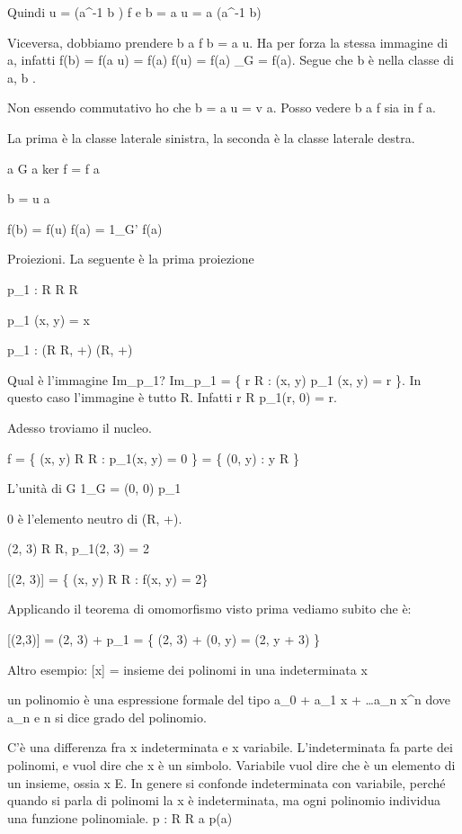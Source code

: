 Quindi u = (a^{-1} \cdot b ) \in \ker f e b = a \cdot u = a \cdot (a^{-1} \cdot b)

Viceversa, dobbiamo prendere b \in a \cdot \ker f \Rightarrow b = a \cdot u. Ha per forza la stessa immagine di a, infatti f(b) = f(a \cdot u) = f(a) \cdot f(u) = f(a) _G = f(a). Segue che b \`e nella classe di a, b \in [a].

Non essendo commutativo ho che b = a \cdot u = v \cdot a. Posso vedere b \in a \cdot \ker f sia in \ker f \cdot a.

La prima \`e la classe laterale sinistra, la seconda \`e la classe laterale destra.

\forall a \in G a \cdot ker f = \ker f \cdot a

b = u \cdot a

f(b) = f(u) \cdot f(a) = 1_{G'} \cdot f(a)

Proiezioni. La seguente \`e la prima proiezione

p_1 : R \times R \to R

p_1 (x, y) = x

p_1 : (R \times R, +) \to (R, +)

Qual \`e l'immagine Im_{p_1}? Im_{p_1} = \{ r \in R : \exists (x, y) p_1 (x, y) = r \}. In questo caso l'immagine \`e tutto R. Infatti \forall r \in R p_1(r, 0) = r.

Adesso troviamo il nucleo.

\ker f = \{ (x, y) \in R \times R : p_1(x, y) = 0 \} = \{ (0, y) : y \in R \}

L'unit\`a di G 1_G = (0, 0) \in \ker p_1

0 \`e l'elemento neutro di (R, +).

(2, 3) \in R \times R, p_1(2, 3) = 2

[(2, 3)] = \{ (x, y) \in R \times R : f(x, y) = 2\}

Applicando il teorema di omomorfismo visto prima vediamo subito che \`e:

[(2,3)] = (2, 3) + \ker p_1 = \{ (2, 3) + (0, y) = (2, y + 3) \}

Altro esempio:
[x] = insieme dei polinomi in una indeterminata x

un polinomio \`e una espressione formale del tipo a_0 + a_1 x + \dots a_n x^n dove a_n  e n si dice grado del polinomio.

C'\`e una differenza fra x \to indeterminata e x \to variabile. L'indeterminata fa parte dei polinomi, e vuol dire che x \`e un simbolo. Variabile vuol dire che \`e un elemento di un insieme, ossia x \in E. In genere si confonde indeterminata con variabile, perch\'e quando si parla di polinomi la x \`e indeterminata, ma ogni polinomio individua una funzione polinomiale. p : R \to R a \mapsto p(a)

